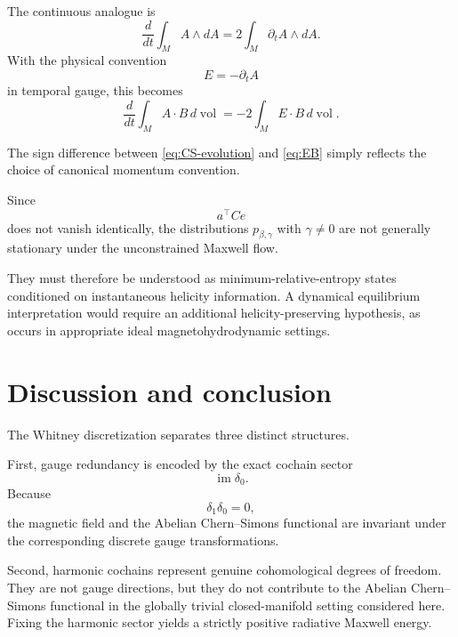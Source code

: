 \documentclass[11pt]{article}
\theoremstyle{definition}
\theoremstyle{remark}
\newcommand{\im}{\operatorname{im}}
\begin{document}
The continuous analogue is
\begin{equation}
\frac{d}{dt}
\int_M A\wedge dA
=
2\int_M
\partial_tA\wedge dA.
\label{eq:continuous-evolution}
\end{equation}
With the physical convention
\begin{equation}
E=-\partial_tA
\end{equation}
in temporal gauge, this becomes
\begin{equation}
\frac{d}{dt}
\int_M A\cdot B\,d\operatorname{vol}
=
-2\int_M E\cdot B\,d\operatorname{vol}.
\label{eq:EB}
\end{equation}

The sign difference between
\eqref{eq:CS-evolution} and \eqref{eq:EB} simply reflects the
choice of canonical momentum convention.

Since
\begin{equation}
a^\top Ce
\end{equation}
does not vanish identically, the distributions
\(p_{\beta,\gamma}\) with \(\gamma\neq0\) are not generally
stationary under the unconstrained Maxwell flow.

They must therefore be understood as minimum-relative-entropy
states conditioned on instantaneous helicity information.
A dynamical equilibrium interpretation would require an
additional helicity-preserving hypothesis, as occurs in
appropriate ideal magnetohydrodynamic settings.

\section{Discussion and conclusion}

The Whitney discretization separates three distinct
structures.

First, gauge redundancy is encoded by the exact cochain
sector
\begin{equation}
\im\delta_0.
\end{equation}
Because
\begin{equation}
\delta_1\delta_0=0,
\end{equation}
the magnetic field and the Abelian Chern--Simons functional
are invariant under the corresponding discrete gauge
transformations.

Second, harmonic cochains represent genuine cohomological
degrees of freedom. They are not gauge directions, but they
do not contribute to the Abelian Chern--Simons functional in
the globally trivial closed-manifold setting considered
here. Fixing the harmonic sector yields a strictly positive
radiative Maxwell energy.
\end{document}
